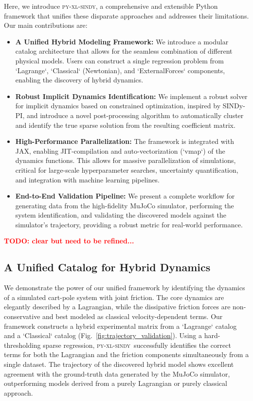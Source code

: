 \documentclass[12pt]{article}
\newcommand{\frameworkname}{\textsc{py-xl-sindy}}
\newcommand{\TODO}[1]{\textbf{\textcolor{red}{\Large TODO: \normalsize #1}}}
\begin{document}
Here, we introduce \frameworkname, a comprehensive and extensible Python framework that unifies these disparate approaches and addresses their limitations. Our main contributions are:
\begin{itemize}
    \item \textbf{A Unified Hybrid Modeling Framework:} We introduce a modular catalog architecture that allows for the seamless combination of different physical models. Users can construct a single regression problem from `Lagrange`, `Classical` (Newtonian), and `ExternalForces` components, enabling the discovery of hybrid dynamics.
    \item \textbf{Robust Implicit Dynamics Identification:} We implement a robust solver for implicit dynamics based on constrained optimization, inspired by SINDy-PI, and introduce a novel post-processing algorithm to automatically cluster and identify the true sparse solution from the resulting coefficient matrix.
    \item \textbf{High-Performance Parallelization:} The framework is integrated with JAX, enabling JIT-compilation and auto-vectorization (`vmap`) of the dynamics functions. This allows for massive parallelization of simulations, critical for large-scale hyperparameter searches, uncertainty quantification, and integration with machine learning pipelines.
    \item \textbf{End-to-End Validation Pipeline:} We present a complete workflow for generating data from the high-fidelity MuJoCo simulator, performing the system identification, and validating the discovered models against the simulator's trajectory, providing a robust metric for real-world performance.
\end{itemize}

\TODO{clear but need to be refined... }

\subsection*{A Unified Catalog for Hybrid Dynamics}
We demonstrate the power of our unified framework by identifying the dynamics of a simulated cart-pole system with joint friction. The core dynamics are elegantly described by a Lagrangian, while the dissipative friction forces are non-conservative and best modeled as classical velocity-dependent terms. Our framework constructs a hybrid experimental matrix from a `Lagrange` catalog and a `Classical` catalog (Fig.~\ref{fig:trajectory_validation}). Using a hard-thresholding sparse regression, \frameworkname\ successfully identifies the correct terms for both the Lagrangian and the friction components simultaneously from a single dataset. The trajectory of the discovered hybrid model shows excellent agreement with the ground-truth data generated by the MuJoCo simulator, outperforming models derived from a purely Lagrangian or purely classical approach.
\end{document}
